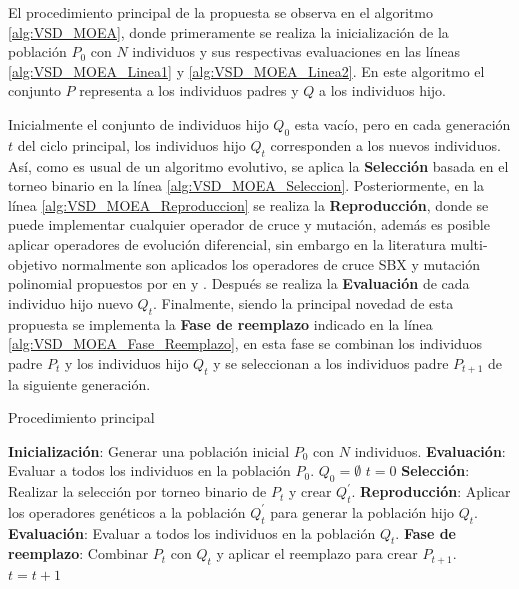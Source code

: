 %
El procedimiento principal de la propuesta se observa en el algoritmo \ref{alg:VSD_MOEA}, donde primeramente se realiza la inicialización de la población $P_0$ con $N$ individuos y sus respectivas evaluaciones en las líneas \ref{alg:VSD_MOEA_Linea1} y \ref{alg:VSD_MOEA_Linea2}.
%
En este algoritmo el conjunto $P$ representa a los individuos padres y $Q$ a los individuos hijo.
%

Inicialmente el conjunto de individuos hijo $Q_0$ esta vacío, pero en cada generación $t$ del ciclo principal, los individuos hijo $Q_{t}$ corresponden a los nuevos individuos.
%
Así, como es usual de un algoritmo evolutivo, se aplica la \textbf{Selección} basada en el torneo binario en la línea \ref{alg:VSD_MOEA_Seleccion}.
%
Posteriormente, en la línea \ref{alg:VSD_MOEA_Reproduccion} se realiza la \textbf{Reproducción}, donde se puede implementar cualquier operador de cruce y mutación, además es posible aplicar operadores de evolución diferencial, sin embargo en la literatura multi-objetivo normalmente son aplicados los operadores de cruce SBX y mutación polinomial propuestos por \citeauthor{Joel:CROSSOVER_DIVERSITY} en  y .
%
Después se realiza la \textbf{Evaluación} de cada individuo hijo nuevo $Q_{t}$.
%
Finalmente, siendo la principal novedad de esta propuesta se implementa la \textbf{Fase de reemplazo} indicado en la línea \ref{alg:VSD_MOEA_Fase_Reemplazo}, en esta fase se combinan los individuos padre $P_t$ y los individuos hijo $Q_t$ y se seleccionan a los individuos padre $P_{t+1}$ de la siguiente generación.
%

%
\begin{algorithm}[H]
\scriptsize
	\caption{Procedimiento principal} 
	\label{alg:VSD_MOEA}
	\begin{algorithmic}[1] 
	\STATE \textbf{Inicialización}: Generar una población inicial $P_0$ con $N$ individuos. \label{alg:VSD_MOEA_Linea1}
	\STATE \textbf{Evaluación}: Evaluar a todos los individuos en la población $P_0$. \label{alg:VSD_MOEA_Linea2}
	\STATE $Q_0 = \emptyset$
	\STATE $t = 0$
	 \label{alg:VSD_MOEA_Ciclo_Principal_Inicio}
		\STATE \textbf{Selección}: Realizar la selección por torneo binario de $P_{t}$ y crear $Q^{\prime}_{t}$. \label{alg:VSD_MOEA_Seleccion}
		\STATE \textbf{Reproducción}: Aplicar los operadores genéticos a la población $Q^{\prime}_{t}$ para generar la población hijo $Q_{t}$.\label{alg:VSD_MOEA_Reproduccion}
		\STATE \textbf{Evaluación}: Evaluar a todos los individuos en la población $Q_{t}$.\label{alg:VSD_MOEA_Evaluacion}
		\STATE \textbf{Fase de reemplazo}: Combinar $P_t$ con $Q_t$ y aplicar el reemplazo para crear $P_{t+1}$. \label{alg:VSD_MOEA_Fase_Reemplazo}
		\STATE $t=t+1$
	\ENDWHILE \label{alg:VSD_MOEA_Ciclo_Principal_Fin}
	\end{algorithmic}
\end{algorithm}

